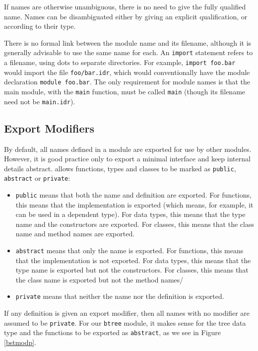 \noindent
If names are otherwise unambiguous, there is no need to give the fully qualified name.
Names can be disambiguated either by giving an explicit qualification, or according to
their type.

There is no formal link between the module name and its filename, although it is generally
advisable to use the same name for each. An \texttt{import} statement refers to a filename,
using dots to separate directories. For example, \texttt{import foo.bar} would import
the file \texttt{foo/bar.idr}, which would conventionally have the module declaration
\texttt{module foo.bar}. The only requirement for module names is that the main module, with
the \texttt{main} function, must be called \texttt{main} (though its filename need not be
\texttt{main.idr}).

\subsection{Export Modifiers}

By default, all names defined in a module are exported for use by other modules.
However, it is good practice only to export a minimal interface and keep internal
details abstract. \Idris{} allows functions, types and classes to be marked
as \texttt{public}, \texttt{abstract} or \texttt{private}:

\begin{itemize}
\item \texttt{public} means that both the name and definition are exported.
For functions, this means that the implementation is exported (which means, for example,
it can be used in a dependent type). For data types, this means that the type name and
the constructors are exported. For classes, this means that the class name and
method names are exported.
\item \texttt{abstract} means that only the name is exported. For functions, this means
that the implementation is not exported. For data types, this means that the type name
is exported but not the constructors. For classes, this means that the class name is exported
but not the method names/
\item \texttt{private} means that neither the name nor the definition is exported.
\end{itemize}

\noindent
If any definition is given an export modifier, then all names with no modifier are assumed
to be \texttt{private}. For our \texttt{btree} module, it makes sense for the
tree data type and the functions to be exported as \texttt{abstract}, as we see in
Figure \ref{bstmodp}.

